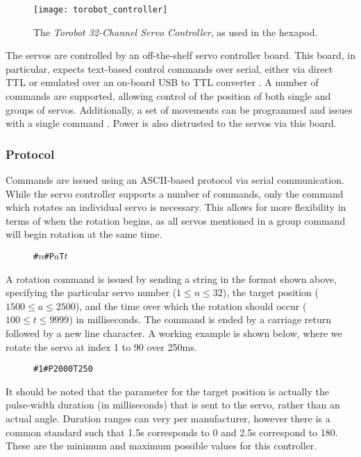 \begin{figure}[!h]
    \centering
    \texttt{[image: torobot\_controller]}
    \caption{The \emph{Torobot 32-Channel Servo Controller}, as used in the hexapod.}
    \label{fig:torobot_controller}
\end{figure}

The servos are controlled by an off-the-shelf servo controller board. This board, in particular, expects text-based control commands over serial, either via direct TTL or emulated over an on-board USB to TTL converter \cite{torobot_manual}. A number of commands are supported, allowing control of the position of both single and groups of servos. Additionally, a set of movements can be programmed and issues with a single command \cite{torobot_manual}. Power is also distrusted to the servos via this board.

\subsubsection{Protocol}

Commands are issued using an ASCII-based protocol via serial communication. While the servo controller supports a number of commands, only the command which rotates an individual servo is necessary. This allows for more flexibility in terms of when the rotation begins, as all servos mentioned in a group command will begin rotation at the same time.

\begin{figure}[!h]
    \centering
    \texttt{\#\(n\)\#P\(a\)T\(t\)}
\end{figure}

A rotation command is issued by sending a string in the format shown above, specifying the particular servo number ($1 \leq n \leq 32$), the target position ($1500 \leq a \leq 2500$), and the time over which the rotation should occur ($100 \leq t \leq 9999$) in milliseconds. The command is ended by a carriage return followed by a new line character. A working example is shown below, where we rotate the servo at index 1 to 90\textdegree{} over 250ms.

\begin{figure}[!h]
    \centering
    \texttt{\#1\#P2000T250}
\end{figure}

It should be noted that the parameter for the target position is actually the pulse-width duration (in milliseconds) that is sent to the servo, rather than an actual angle. Duration ranges can very per manufacturer, however there is a common standard such that 1.5\textmu s corresponds to 0\textdegree{} and 2.5\textmu s correspond to 180\textdegree. These are the minimum and maximum possible values for this controller. 

